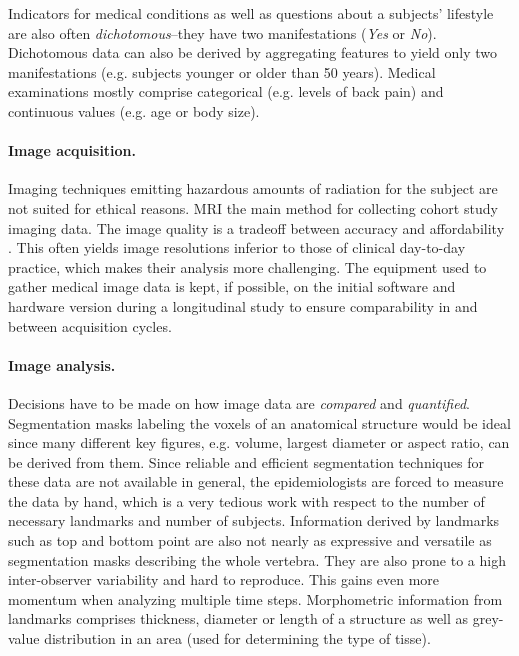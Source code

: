 \documentclass[journal]{style/vgtc} 			          %
\begin{document}
Indicators for medical conditions as well as questions about a subjects' lifestyle are also often \emph{dichotomous}--they have two manifestations (\emph{Yes} or \emph{No}).
%
%
Dichotomous data can also be derived by aggregating features to yield only two manifestations (e.g. subjects younger or older than 50 years).
%
Medical examinations mostly comprise categorical (e.g. levels of back pain) and continuous values (e.g. age or body size).

\paragraph{Image acquisition.} \label{ImageAcquisition} Imaging techniques emitting hazardous amounts of radiation for the subject are not suited for ethical reasons.
%
MRI the main method for collecting cohort study imaging data.
%
The image quality is a tradeoff between accuracy and affordability \cite{Preim2014}.
%
This often yields image resolutions inferior to those of clinical day-to-day practice, which makes their analysis more challenging.
The equipment used to gather medical image data is kept, if possible, on the initial software and hardware version during a longitudinal study to ensure comparability in and between acquisition cycles.

\paragraph{Image analysis.} \label{ImageAnalysis} Decisions have to be made on how image data are \emph{compared} and \emph{quantified}.
%
Segmentation masks labeling the voxels of an anatomical structure would be ideal since many different key figures, e.g. volume, largest diameter or aspect ratio, can be derived from them.
%
Since reliable and efficient segmentation techniques for these data are not available in general, the epidemiologists are forced to measure the data by hand, which is a very tedious work with respect to the number of necessary landmarks and number of subjects.
%
Information derived by landmarks such as top and bottom point are also not nearly as expressive and versatile as segmentation masks describing the whole vertebra.
%
They are also prone to a high inter-observer variability and hard to reproduce.
%
This gains even more momentum when analyzing multiple time steps.
%
Morphometric information from landmarks comprises thickness, diameter or length of a structure as well as grey-value distribution in an area (used for determining the type of tisse).
\end{document}

